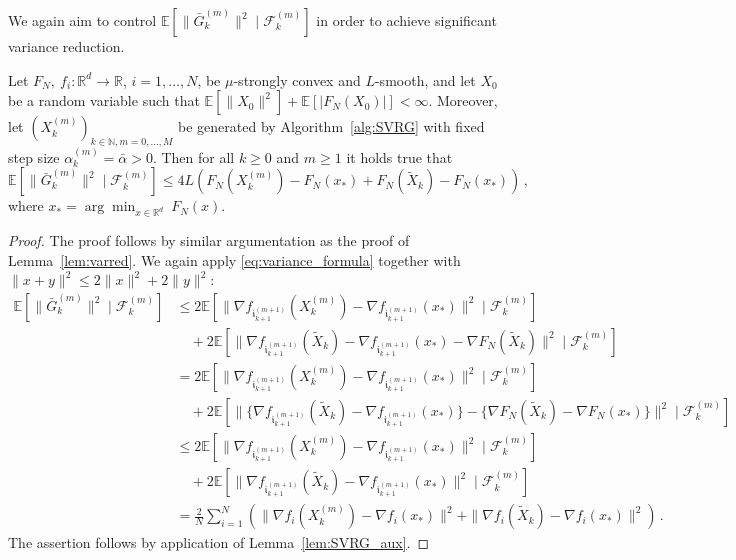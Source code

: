 \documentclass[12pt,openany]{book}
\theoremstyle{definition}
\theoremstyle{definition}
\newcommand{\cF}{\mathcal{F}}
\newcommand{\E}{\mathbb{E}}
\newcommand{\N}{\mathbb{N}}
\newcommand{\R}{\mathbb{R}}
\begin{document}
We again aim to control $\E[\|\bar G_k^{(m)}\|^2\mid\cF_k^{(m)}]$ in order to achieve significant variance reduction.

\begin{lemma}\label{lem:SVRG_aux2}
Let $F_N,\ f_i:\R^d\to\R$, $i=1,\dots,N$, be $\mu$-strongly convex and $L$-smooth, and let $X_0$ be a random variable such that $\E[\|X_0\|^2] + \E[|F_N(X_0)|]<\infty$. Moreover, let $(X_k^{(m)})_{k\in\N, m=0,\dots,M}$ be generated by Algorithm~\ref{alg:SVRG} with fixed step size $\alpha_k^{(m)} =\bar\alpha>0$. Then for all $k\ge0$ and $m\ge1$ it holds true that
\[ \E[\|\bar G_k^{(m)}\|^2\mid \cF_k^{(m)}] \le 4L \left(F_N(X_k^{(m)})-F_N(x_\ast) + F_N(\tilde X_k)-F_N(x_\ast) \right)\,,\]
where $x_\ast =\arg\min_{x\in\R^d}\ F_N(x)$.
\end{lemma}
\begin{proof}
The proof follows by similar argumentation as the proof of Lemma~\ref{lem:varred}. We again apply \eqref{eq:variance_formula} together with $\|x+y\|^2 \le 2\|x\|^2 + 2\|y\|^2$:
\begin{align*}
\E[\|\bar G_k^{(m)}\|^2\mid \cF_k^{(m)}]&\le 2\E[\|\nabla f_{\mathfrak i_{k+1}^{(m+1)}}(X_k^{(m)})- \nabla f_{\mathfrak i_{k+1}^{(m+1)}}(x_\ast)\|^2\mid \cF_k^{(m)}]\\&\quad + 2\E[\|\nabla f_{\mathfrak i_{k+1}^{(m+1)}}(\tilde X_k)-\nabla f_{\mathfrak i_{k+1}^{(m+1)}}(x_\ast) - \nabla F_N(\tilde X_k)\|^2\mid \cF_k^{(m)}]\\
&=2\E[\|\nabla f_{\mathfrak i_{k+1}^{(m+1)}}(X_k^{(m)})- \nabla f_{\mathfrak i_{k+1}^{(m+1)}}(x_\ast)\|^2\mid \cF_k^{(m)}]\\
&\quad+2\E[\|\{\nabla f_{\mathfrak i_{k+1}^{(m+1)}}(\tilde X_k)-\nabla f_{\mathfrak i_{k+1}^{(m+1)}}(x_\ast)\} - \{\nabla F_N(\tilde X_k)-\nabla F_N(x_\ast)\}\|^2\mid \cF_k^{(m)}]\\
&\le 2\E[\|\nabla f_{\mathfrak i_{k+1}^{(m+1)}}(X_k^{(m)})- \nabla f_{\mathfrak i_{k+1}^{(m+1)}}(x_\ast)\|^2\mid \cF_k^{(m)}]\\
&\quad+2\E[\|\nabla f_{\mathfrak i_{k+1}^{(m+1)}}(\tilde X_k)-\nabla f_{\mathfrak i_{k+1}^{(m+1)}}(x_\ast)\|^2\mid \cF_k^{(m)}]\\
& = \frac{2}{N}\sum_{i=1}^N\left(\|\nabla f_i(X_k^{(m)})- \nabla f_i(x_\ast)\|^2+\|\nabla f_i(\tilde X_k)-\nabla f_i(x_\ast)\|^2\right)\,.
\end{align*}
The assertion follows by application of Lemma~\ref{lem:SVRG_aux}.
\end{proof}
\end{document}
